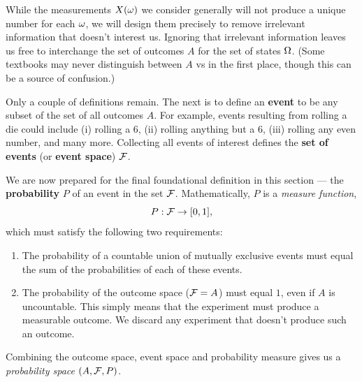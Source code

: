 While the measurements $X(\omega)$ we consider generally will not produce a unique number for each $\omega$, we will design them precisely to remove irrelevant information that doesn't interest us.
Ignoring that irrelevant information leaves us free to interchange the set of outcomes $A$ for the set of states $\Omega$.
(Some textbooks may never distinguish between $A$ vs \Om in the first place, though this can be a source of confusion.)

Only a couple of definitions remain.
The next is to define an \textbf{event} to be any subset of the set of all outcomes $A$.
For example, events resulting from rolling a die could include (i) rolling a $6$, (ii) rolling anything but a $6$, (iii) rolling any even number, and many more.
Collecting all events of interest defines the \textbf{set of events} (or \textbf{event space}) $\mathcal F$.

We are now prepared for the final foundational definition in this section --- the \textbf{probability} $P$ of an event in the set $\mathcal F$.
Mathematically, $P$ is a \textit{measure function},
\begin{equation*}
  P: \mathcal F \to [0, 1],
\end{equation*}
which must satisfy the following two requirements: \\[-24 pt]
\begin{enumerate}
  \item The probability of a countable union of mutually exclusive events must equal the sum of the probabilities of each of these events.
  \item The probability of the outcome space ($\mathcal F = A$) must equal $1$, even if $A$ is uncountable.
        This simply means that the experiment \cE must produce a measurable outcome.
        We discard any experiment that doesn't produce such an outcome. \\[-24 pt]
\end{enumerate}
Combining the outcome space, event space and probability measure gives us a \textit{probability space} $(A, \mathcal F, P)$.

